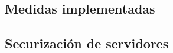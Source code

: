 \documentclass[12pt,a4paper, twoside]{report}
\begin{document}
	
	 
	\subsection{Medidas implementadas}
	
	
	\subsection{Securización de servidores}\label{certificadoSSL}
		
\end{document}
